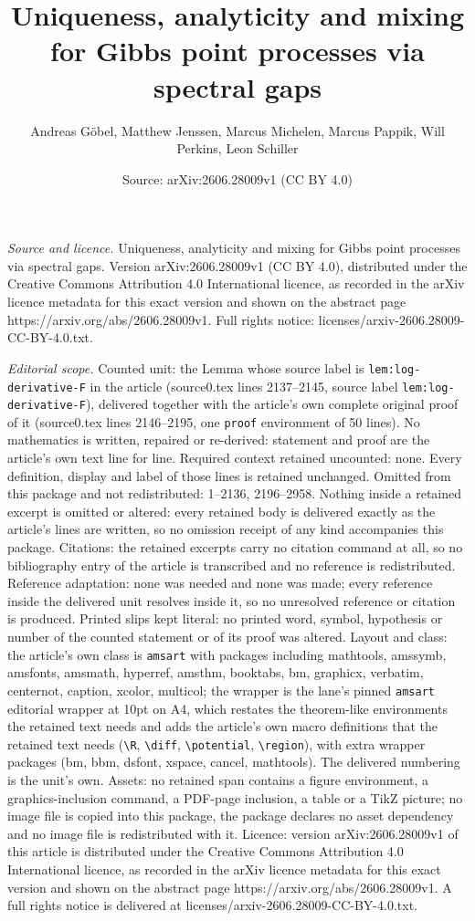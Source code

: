 \documentclass[10pt,a4paper]{amsart}
\title[Uniqueness, analyticity and mixing for Gibbs point processes]{Uniqueness, analyticity and mixing for Gibbs point processes via spectral gaps}
\author{Andreas G\"obel, Matthew Jenssen, Marcus Michelen, Marcus Pappik, Will Perkins, Leon Schiller}
\date{Source: arXiv:2606.28009v1 (CC BY 4.0)}
\begin{document}
\maketitle

\noindent\emph{Source and licence.} Uniqueness, analyticity and mixing for Gibbs point processes via spectral gaps. Version arXiv:2606.28009v1 (CC BY 4.0), distributed under the Creative Commons Attribution 4.0 International licence, as recorded in the arXiv licence metadata for this exact version and shown on the abstract page https://arxiv.org/abs/2606.28009v1. Full rights notice: licenses/arxiv-2606.28009-CC-BY-4.0.txt.\par\smallskip

\noindent\textit{Editorial scope.} Counted unit: the Lemma whose source label is \texttt{lem:log-derivative-F} in the article (source0.tex lines 2137--2145, source label \texttt{lem:log-derivative-F}), delivered together with the article's own complete original proof of it (source0.tex lines 2146--2195, one \texttt{proof} environment of 50 lines). No mathematics is written, repaired or re-derived: statement and proof are the article's own text line for line. Required context retained uncounted: none. Every definition, display and label of those lines is retained unchanged. Omitted from this package and not redistributed: 1--2136, 2196--2958. Nothing inside a retained excerpt is omitted or altered: every retained body is delivered exactly as the article's lines are written, so no omission receipt of any kind accompanies this package. Citations: the retained excerpts carry no citation command at all, so no bibliography entry of the article is transcribed and no reference is redistributed. Reference adaptation: none was needed and none was made; every reference inside the delivered unit resolves inside it, so no unresolved reference or citation is produced. Printed slips kept literal: no printed word, symbol, hypothesis or number of the counted statement or of its proof was altered. Layout and class: the article's own class is \texttt{amsart} with packages including mathtools, amssymb, amsfonts, amsmath, hyperref, amsthm, booktabs, bm, graphicx, verbatim, centernot, caption, xcolor, multicol; the wrapper is the lane's pinned \texttt{amsart} editorial wrapper at 10pt on A4, which restates the theorem-like environments the retained text needs and adds the article's own macro definitions that the retained text needs (\texttt{\textbackslash R}, \texttt{\textbackslash diff}, \texttt{\textbackslash potential}, \texttt{\textbackslash region}), with extra wrapper packages (bm, bbm, dsfont, xspace, cancel, mathtools). The delivered numbering is the unit's own. Assets: no retained span contains a figure environment, a graphics-inclusion command, a PDF-page inclusion, a table or a TikZ picture; no image file is copied into this package, the package declares no asset dependency and no image file is redistributed with it. Licence: version arXiv:2606.28009v1 of this article is distributed under the Creative Commons Attribution 4.0 International licence, as recorded in the arXiv licence metadata for this exact version and shown on the abstract page https://arxiv.org/abs/2606.28009v1. A full rights notice is delivered at licenses/arxiv-2606.28009-CC-BY-4.0.txt. 
\end{document}
